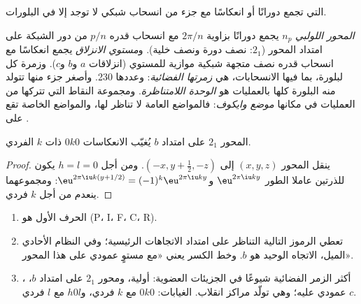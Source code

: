  التي تجمع دورانًا أو انعكاسًا مع جزء من
انسحاب شبكي لا توجد إلا في البلورات.

\begin{definition}\label{def:b3:x-ray-diffraction:space-group}
\emph{المحور اللولبي} $n_p$ يجمع دورانًا بزاوية $2\pi/n$ مع
انسحاب قدره $p/n$ من دور الشبكة على امتداد المحور ($2_1$: نصف دورة 
ونصف خلية). و\emph{مستوي الانزلاق} يجمع انعكاسًا مع
انسحاب قدره نصف متجهة شبكية موازية للمستوي (انزلاقات $a$ و$b$ و$c$).
وزمرة كل  لبلورة، بما فيها الانسحابات،
هي \emph{زمرتها الفضائية}: وعددها 230. وأصغر جزء منها
تتولد منه البلورة كلها بالعمليات هو
\emph{الوحدة اللامتناظرة}. ومجموعة النقاط التي تتركها
 من العمليات في مكانها \emph{موضع
وايكوف}: فالمواضع العامة لا تناظر لها، والمواضع
الخاصة تقع على .
\end{definition}

\begin{proposition}\label{prop:b3:x-ray-diffraction:screw-absence}
المحور $2_1$ على امتداد $b$ يُغيّب الانعكاسات $0k0$ ذات $k$ الفردي.
\end{proposition}

\begin{proof}
ينقل المحور $(x, y, z)$ إلى $(-x, y + \frac12, -z)$. ومن أجل $h = l = 0$ يكون للذرتين
عاملا الطور $\eu^{2\pi\iu ky}$ و$\eu^{2\pi\iu k(y + 1/2)} = (-1)^k\eu^{2\pi\iu ky}$: ومجموعهما
ينعدم من أجل $k$ فردي.
\end{proof}

\begin{method}\label{met:b3:x-ray-diffraction:read-space-group}
\begin{enumerate}
  \item الحرف الأول هو  (P، I، F، C، R).
  \item تعطي الرموز التالية التناظر على امتداد الاتجاهات الرئيسية؛ وفي
        النظام الأحادي الميل، الاتجاه الوحيد هو $b$. وخط الكسر يعني
        «مع مستوٍ عمودي على هذا المحور».
  \item {}، أكثر الزمر الفضائية شيوعًا في الجزيئات العضوية: أولية،
        ومحور $2_1$ على امتداد $b$،  $c$ عمودي عليه؛ وهي
        تولّد مراكز انقلاب. الغيابات: $0k0$ مع $k$ فردي، و$h0l$ مع $l$
        فردي.
\end{enumerate}
\end{method}

